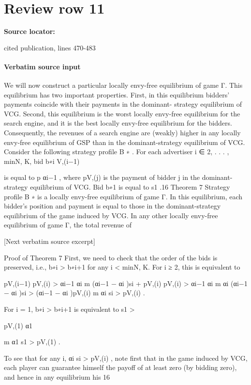 \documentclass[10pt]{article}
\begin{document}
\section*{Review row 11}
\textbf{Source locator:} {\footnotesize\raggedright cited publication, lines 470-\allowbreak{}483\par}
\paragraph{Verbatim source input}
\begin{ReviewVerbatim}
We will now construct a particular locally envy-free equilibrium of game Γ. This equilibrium
has two important properties. First, in this equilibrium bidders’ payments coincide with their
payments in the dominant- strategy equilibrium of VCG. Second, this equilibrium is the worst
locally envy-free equilibrium for the search engine, and it is the best locally envy-free equilibrium
for the bidders. Consequently, the revenues of a search engine are (weakly) higher in any locally
envy-free equilibrium of GSP than in the dominant-strategy equilibrium of VCG.
Consider the following strategy profile B ∗ . For each advertiser i ∈ {2, . . . , min{N, K}}, bid b∗i
V,(i−1)

is equal to p αi−1 , where pV,(j) is the payment of bidder j in the dominant-strategy equilibrium of
VCG. Bid b∗1 is equal to s1 .16
Theorem 7 Strategy profile B ∗ is a locally envy-free equilibrium of game Γ. In this equilibrium,
each bidder’s position and payment is equal to those in the dominant-strategy equilibrium of the
game induced by VCG. In any other locally envy-free equilibrium of game Γ, the total revenue of

[Next verbatim source excerpt]

Proof of Theorem 7
First, we need to check that the order of the bids is preserved, i.e., b∗i > b∗i+1 for any i < min{N, K}.
For i ≥ 2, this is equivalent to

pV,(i−1)
pV,(i)
>
αi−1
αi
m
(αi−1 − αi )si + pV,(i)
pV,(i)
>
αi−1
αi
m
αi (αi−1 − αi )si > (αi−1 − αi )pV,(i)
m
αi si > pV,(i) .

For i = 1, b∗i > b∗i+1 is equivalent to
s1 >

pV,(1)
α1

m
α1 s1 > pV,(1) .

To see that for any i, αi si > pV,(i) , note first that in the game induced by VCG, each player can
guarantee himself the payoff of at least zero (by bidding zero), and hence in any equilibrium his
16



\end{ReviewVerbatim}
\end{document}
